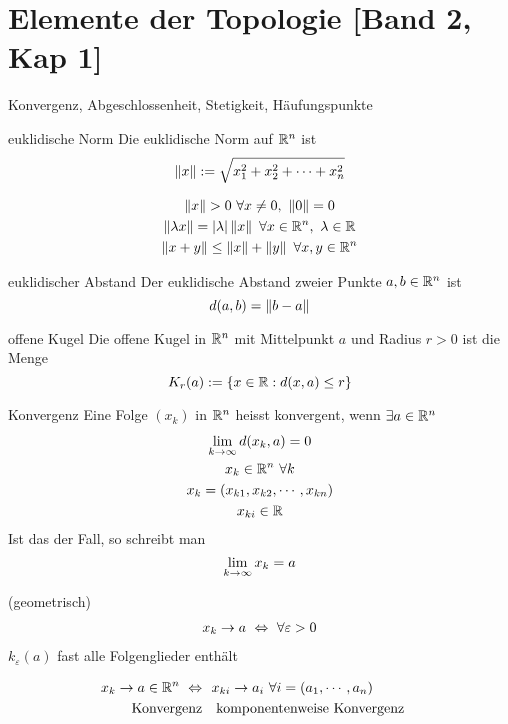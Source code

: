\section{Elemente der Topologie [Band 2, Kap 1]}
Konvergenz, Abgeschlossenheit, Stetigkeit, Häufungspunkte
\begin{Def}{euklidische Norm}
  Die euklidische Norm auf $\mathbb{R}^n$ ist 
  \[\left\| x \right\|:=\sqrt{x_1^2+x_2^2+\cdots+x^2_n}\]
\end{Def}
\begin{Eig}
  \begin{gather}
    \Norm{x}>0\ \forall x\neq 0,\ \Norm{0}=0\\
    \Norm{\lambda x}=\Abs{\lambda}\Norm{x}\ \forall x\in\mb{R}^n,\ \lambda\in\mb{R}\\
    \Norm{x+y}\leq \Norm{x}+\Norm{y}\ \forall x,y\in\mb{R}^n
  \end{gather}
\end{Eig}
\begin{Def}{euklidischer Abstand}
  Der euklidische Abstand zweier Punkte $a,b\in\mathbb{R}^n$ ist
  \[d(a,b)=\left\| b-a \right\|\]
\end{Def}
\begin{Def}{offene Kugel}
  Die offene Kugel in $\mathbb{R}^n$ mit Mittelpunkt $a$ und Radius $r>0$ ist die Menge
  \[K_r(a):=\left\{ x\in\mathbb{R}:d(x,a)\le r \right\}\]
\end{Def}
\begin{Def}{Konvergenz}
  Eine Folge $(x_k)$ in $\mathbb{R}^n$ heisst konvergent, wenn $\exists a\in\mathbb{R}^n$
  \begin{gather*}
    \displaystyle\lim_{k\rightarrow\infty} d(x_k,a)=0\\
    x_k\in\mathbb{R}^n\ \forall k\\
    x_k=(x_{k1},x_{k2},\cdots,x_{kn})\\
    x_{ki}\in\mathbb{R}
  \end{gather*}
  Ist das der Fall, so schreibt man
  \[\displaystyle\lim_{k\rightarrow\infty}x_k=a\]
\end{Def}
\begin{Bem}
  (geometrisch)
  \begin{gather*}
    x_k\to a\ \Leftrightarrow\ \forall\varepsilon>0
  \end{gather*}
  $k_\varepsilon(a)$ fast alle Folgenglieder enthält
\end{Bem}
\begin{Lem}
  \begin{align*}
    x_k\to a\in \mathbb{R}^n\ \Leftrightarrow&\ \ x_{ki}\to a_i\ \forall i
    =(a_1,\cdots,a_n) & \\
    \text{Konvergenz}& \ \ \ \text{komponentenweise Konvergenz}
  \end{align*}
\end{Lem}
